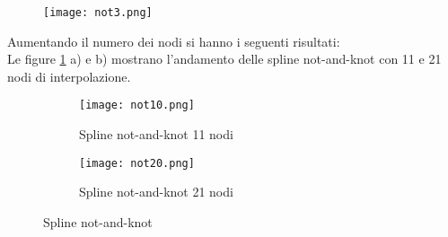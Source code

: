 \documentclass[a4paper,12pt]{report}
\theoremstyle{definition}
\begin{document}
\begin{figure}[h!]
	\centering
	\texttt{[image: not3.png]}
	\caption{}
\end{figure}
\newpage
Aumentando il numero dei nodi si hanno i seguenti risultati:\\
Le figure \ref{fig:6pts} a) e b) mostrano l'andamento delle spline not-and-knot con 11 e 21 nodi di interpolazione.
\begin{figure}[h!t]
	\centering
	\begin{subfigure}{0.6\linewidth}
		\texttt{[image: not10.png]} 
		\caption{Spline not-and-knot 11 nodi}
	\end{subfigure}
	\begin{subfigure}{0.6\linewidth}
		\texttt{[image: not20.png]}
		\caption{Spline not-and-knot 21 nodi}
	\end{subfigure}
	\caption{Spline not-and-knot}
	\label{fig:6pts}
\end{figure}
\newpage
\end{document}

